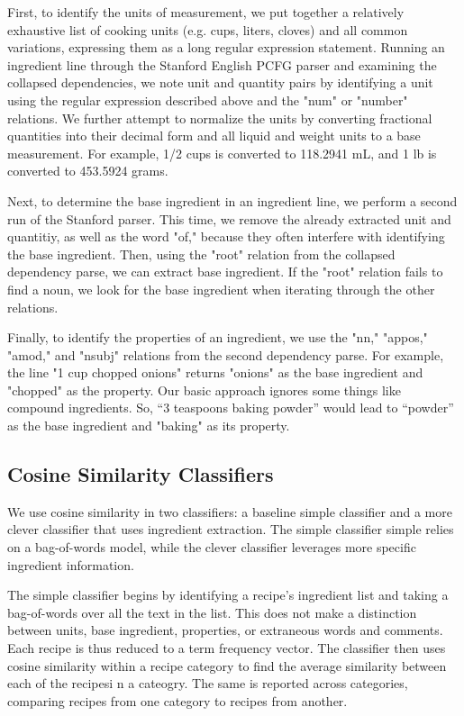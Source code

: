 \documentclass[11pt]{article}
\begin{document}
First, to identify the units of measurement, we put together a relatively exhaustive list of cooking units (e.g. cups, liters, cloves) and all common variations, expressing them as a long regular expression statement. Running an ingredient line through the Stanford English PCFG parser and examining the collapsed dependencies, we note unit and quantity pairs by identifying a unit using the regular expression described above and the "num" or "number" relations. We further attempt to normalize the units by converting fractional quantities into their decimal form and all liquid and weight units to a base measurement. For example, 1/2 cups is converted to 118.2941 mL, and 1 lb is converted to 453.5924 grams. 

Next, to determine the base ingredient in an ingredient line, we perform a second run of the Stanford parser. This time, we remove the already extracted unit and quantitiy, as well as the word "of," because they often interfere with identifying the base ingredient. Then, using the "root" relation from the collapsed dependency parse, we can extract base ingredient. If the "root" relation fails to find a noun, we look for the base ingredient when iterating through the other relations. 

Finally, to identify the properties of an ingredient, we use the "nn," "appos," "amod," and "nsubj" relations from the second dependency parse. For example, the line "1 cup chopped onions" returns "onions" as the base ingredient and "chopped" as the property. Our basic approach ignores some things like compound ingredients. So, “3 teaspoons baking powder” would lead to “powder” as the base ingredient and "baking" as its property.

\subsection{Cosine Similarity Classifiers}
We use cosine similarity in two classifiers: a baseline simple classifier and a more clever classifier that uses ingredient extraction. The simple classifier simple relies on a bag-of-words model, while the clever classifier leverages more specific ingredient information. 

The simple classifier begins by identifying a recipe's ingredient list and taking a bag-of-words over all the text in the list. This does not make a distinction between units, base ingredient, properties, or extraneous words and comments. Each recipe is thus reduced to a term frequency vector. The classifier then uses cosine similarity within a recipe category to find the average similarity between each of the recipesi n a cateogry. The same is reported across categories, comparing recipes from one category to recipes from another. 
\end{document}

